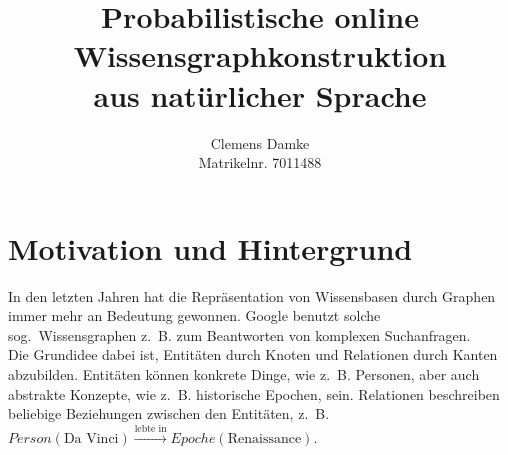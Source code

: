 \documentclass[11pt, a4paper]{scrreprt}
\begin{document}
\frontmatter
\titlehead{Entwurf 1}
\subject{Bachelorarbeit Proposal}
\title{
	Probabilistische online\\
	Wissensgraphkonstruktion\\
	aus natürlicher Sprache
}
\author{
	Clemens Damke\\[1ex]
	Matrikelnr. 7011488
}
\publishers{
	{\normalsize betreut von}\\[2ex]
	Prof.~Dr.~Eyke Hüllermeier\\
	Intelligente Systeme\\
	Institut für Informatik\\
	Universität Paderborn
}
\maketitle

\section{Motivation und Hintergrund}

In den letzten Jahren hat die Repräsentation von Wissensbasen durch Graphen immer mehr an Bedeutung gewonnen.
Google benutzt solche sog.\ Wissensgraphen z.~B. zum Beantworten von komplexen Suchanfragen.\\

Die Grundidee dabei ist, Entitäten durch Knoten und Relationen durch Kanten abzubilden.
Entitäten können konkrete Dinge, wie z.~B. Personen, aber auch abstrakte Konzepte, wie z.~B. historische Epochen, sein.
Relationen beschreiben beliebige Beziehungen zwischen den Entitäten, z.~B. $Person(\text{Da~Vinci}) \xrightarrow{\text{lebte~in}} Epoche(\text{Renaissance})$.\\
\end{document}
